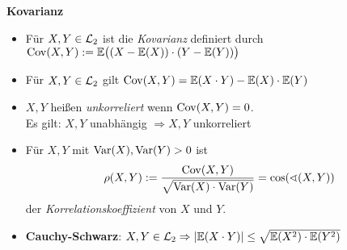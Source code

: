 \textbf{Kovarianz}
\begin{itemize}
\item Für $X,Y\in\mathcal{L}_2$ ist die \textit{Kovarianz} definiert durch
 \mbox{$\operatorname{Cov}(X,Y) := \mathbb{E}\big( (X-\mathbb{E}(X)) \cdot (Y-\mathbb{E}(Y)) \big)$}

\item Für $X,Y\in\mathcal{L}_2$ gilt $\operatorname{Cov}(X,Y) = \mathbb{E}(X \cdot Y) - \mathbb{E}(X) \cdot \mathbb{E}(Y)$

\item $X,Y$ heißen \textit{unkorreliert} wenn $\operatorname{Cov}(X,Y) = 0$.\\
  Es gilt: $X,Y$ unabhängig $\Rightarrow X,Y$ unkorreliert
  \marginpar{\vspace{-3.45em}\begin{equation}\label{unabhaengig_kor}\end{equation}}

\item Für $X,Y$ mit $\operatorname{Var}(X),\operatorname{Var}(Y)>0$ ist
  \[
    \rho(X,Y) := \frac{\operatorname{Cov}(X,Y)}{\sqrt{\operatorname{Var}(X)\cdot\operatorname{Var}(Y)}} =
    \cos(\sphericalangle (X,Y))
  \]
  der \textit{Korrelationskoeffizient} von $X$ und $Y$.

\item \textbf{Cauchy-Schwarz}: $X,Y\in\mathcal{L}_2
  \Rightarrow |\mathbb{E}(X \cdot Y)| \leq \sqrt{\mathbb{E}(X^2) \cdot \mathbb{E}(Y^2)}$
\end{itemize}
